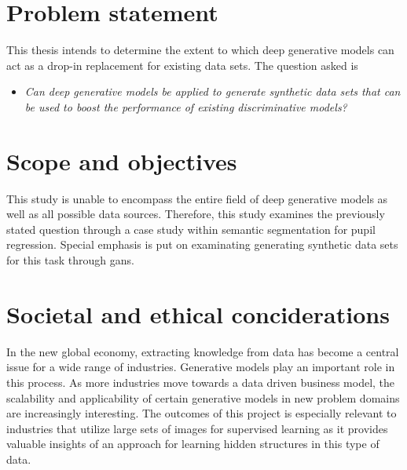 \section{Problem statement}
This thesis intends to determine the extent to which deep generative models can act as a drop-in replacement for existing data sets. The question asked is

\begin{itemize}
    \item \textit{Can deep generative models be applied to generate synthetic data sets that can be used to boost the performance of existing discriminative models?}
\end{itemize}


\section{Scope and objectives}
This study is unable to encompass the entire field of deep generative models as well as all possible data sources. Therefore, this study examines the previously stated question through a case study within semantic segmentation for pupil regression. Special emphasis is put on examinating generating synthetic data sets for this task through \acrlong{gans}.

\section{Societal and ethical conciderations}
In the new global economy, extracting knowledge from data has become a central issue for a wide range of industries. Generative models play an important role in this process. As more industries move towards a data driven business model, the scalability and applicability of certain generative models in new problem domains are increasingly interesting. The outcomes of this project is especially relevant to industries that utilize large sets of images for supervised learning as it provides valuable insights of an approach for learning hidden structures in this type of data.

